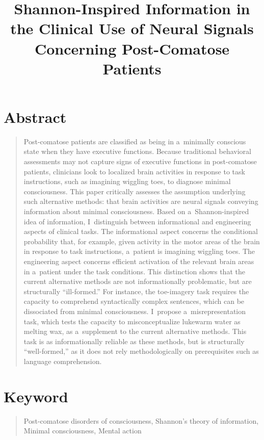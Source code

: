 

\title{Shannon-Inspired Information in the Clinical Use of Neural Signals Concerning Post-Comatose Patients}
\maketitle

\section*{Abstract}
\begin{quotation}
Post-comatose patients are classified as being in a~minimally conscious state when they have executive functions. Because traditional behavioral assessments may not capture signs of executive functions in post-comatose patients, clinicians look to localized brain activities in response to task instructions, such as imagining wiggling toes, to diagnose minimal consciousness. This paper critically assesses the assumption underlying such alternative methods: that brain activities are neural signals conveying information about minimal consciousness. Based on a~Shannon-inspired idea of information, I~distinguish between informational and engineering aspects of clinical tasks. The informational aspect concerns the conditional probability that, for example, given activity in the motor areas of the brain in response to task instructions, a~patient is imagining wiggling toes. The engineering aspect concerns efficient activation of the relevant brain areas in a~patient under the task conditions. This distinction shows that the current alternative methods are not informationally problematic, but are structurally ``ill-formed.'' For instance, the toe-imagery task requires the capacity to comprehend syntactically complex sentences, which can be dissociated from minimal consciousness. I~propose a~misrepresentation task, which tests the capacity to misconceptualize lukewarm water as melting wax, as a~supplement to the current alternative methods. This task is as informationally reliable as these methods, but is structurally ``well-formed,'' as it does not rely methodologically on prerequisites such as language comprehension.

\end{quotation}
\section*{Keyword}
\begin{quotation}
Post-comatose disorders of consciousness, Shannon's theory of information, Minimal consciousness, Mental action

\end{quotation}
